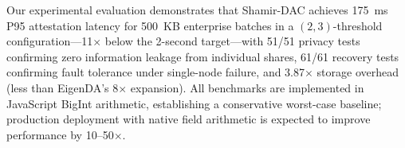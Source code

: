 Our experimental evaluation demonstrates that Shamir-DAC achieves 175~ms P95
attestation latency for 500~KB enterprise batches in a $(2,3)$-threshold
configuration---11$\times$ below the 2-second target---with 51/51 privacy
tests confirming zero information leakage from individual shares, 61/61
recovery tests confirming fault tolerance under single-node failure, and
3.87$\times$ storage overhead (less than EigenDA's 8$\times$ expansion). All
benchmarks are implemented in JavaScript BigInt arithmetic, establishing a
conservative worst-case baseline; production deployment with native field
arithmetic is expected to improve performance by 10--50$\times$.
